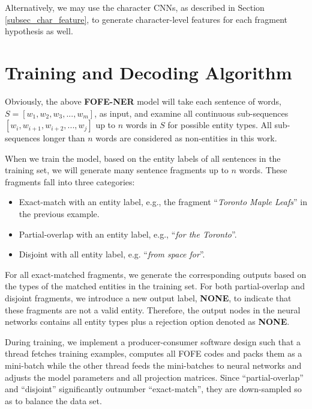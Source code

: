 \documentclass[11pt,a4paper]{article}
\begin{document}
Alternatively, we may use the character CNNs, as described in Section \ref{subsec_char_feature}, to generate character-level features for each fragment hypothesis as well.

\section{Training and Decoding Algorithm}

Obviously, the above \textbf{FOFE-NER} model will take each sentence of words, $S = [w_1, w_2, w_3, ..., w_m]$, as input, and examine all continuous sub-sequences $[w_i, w_{i+1}, w_{i+2}, ..., w_{j}]$ up to $n$ words in $S$ for  possible entity types. All sub-sequences longer than $n$ words are considered as non-entities in this work. 

When we train the model, based on the entity labels of all sentences in the training set, we will generate many sentence fragments up to $n$ words. These fragments fall into three categories:
\begin{itemize}
	\item Exact-match with an entity label, e.g., the fragment  ``{\it Toronto Maple Leafs}'' in the previous example. 
	\item Partial-overlap with an entity label, e.g., ``{\it for the Toronto}''.
	\item Disjoint with all entity label, e.g. ``{\it from space for}''.
\end{itemize}

For all exact-matched fragments, we generate the corresponding outputs based on the types of the matched entities in the training set. For both partial-overlap and disjoint fragments, we introduce a new output label, {\bf NONE}, to indicate that these fragments are not a valid entity. Therefore, the output nodes in the neural networks contains all entity types plus a rejection option denoted as {\bf NONE}.

During training, we implement a producer-consumer software design such that 
a thread fetches training examples, computes all FOFE codes and packs them as a mini-batch while the other thread feeds the mini-batches to neural networks and adjusts the model parameters and all projection matrices. 
Since ``partial-overlap'' and ``disjoint'' significantly outnumber ``exact-match'', they are down-sampled so as to balance the data set. %
\end{document}
